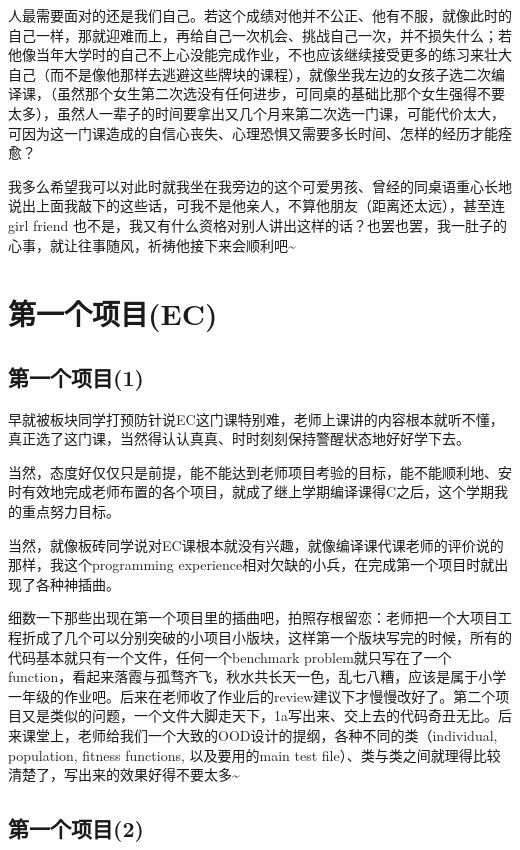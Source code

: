 \documentclass[12pt]{book}
\begin{document}
人最需要面对的还是我们自己。若这个成绩对他并不公正、他有不服，就像此时的自己一样，那就迎难而上，再给自己一次机会、挑战自己一次，并不损失什么；若他像当年大学时的自己不上心没能完成作业，不也应该继续接受更多的练习来壮大自己（而不是像他那样去逃避这些牌块的课程），就像坐我左边的女孩子选二次编译课，（虽然那个女生第二次选没有任何进步，可同桌的基础比那个女生强得不要太多），虽然人一辈子的时间要拿出又几个月来第二次选一门课，可能代价太大，可因为这一门课造成的自信心丧失、心理恐惧又需要多长时间、怎样的经历才能痊愈？

我多么希望我可以对此时就我坐在我旁边的这个可爱男孩、曾经的同桌语重心长地说出上面我敲下的这些话，可我不是他亲人，不算他朋友（距离还太远），甚至连 girl friend 也不是，我又有什么资格对别人讲出这样的话？也罢也罢，我一肚子的心事，就让往事随风，祈祷他接下来会顺利吧\textasciitilde{}~

\chapter{第一个项目(EC)}
\label{sec-24}
\section{第一个项目(1)}
\label{sec-24-1}

早就被板块同学打预防针说EC这门课特别难，老师上课讲的内容根本就听不懂，真正选了这门课，当然得认认真真、时时刻刻保持警醒状态地好好学下去。

当然，态度好仅仅只是前提，能不能达到老师项目考验的目标，能不能顺利地、安时有效地完成老师布置的各个项目，就成了继上学期编译课得C之后，这个学期我的重点努力目标。

当然，就像板砖同学说对EC课根本就没有兴趣，就像编译课代课老师的评价说的那样，我这个programming experience相对欠缺的小兵，在完成第一个项目时就出现了各种神插曲。

细数一下那些出现在第一个项目里的插曲吧，拍照存根留恋：老师把一个大项目工程折成了几个可以分别突破的小项目小版块，这样第一个版块写完的时候，所有的代码基本就只有一个文件，任何一个benchmark problem就只写在了一个function，看起来落霞与孤骛齐飞，秋水共长天一色，乱七八糟，应该是属于小学一年级的作业吧。后来在老师收了作业后的review建议下才慢慢改好了。第二个项目又是类似的问题，一个文件大脚走天下，1a写出来、交上去的代码奇丑无比。后来课堂上，老师给我们一个大致的OOD设计的提纲，各种不同的类（individual, population, fitness functions, 以及要用的main test file）、类与类之间就理得比较清楚了，写出来的效果好得不要太多\textasciitilde{}~

\section{第一个项目(2)}
\label{sec-24-2}
\end{document}
